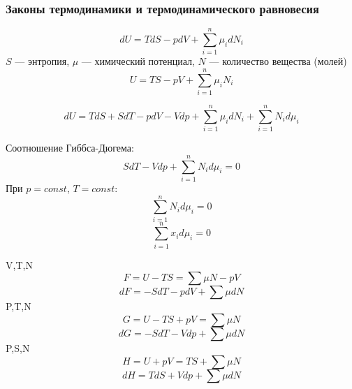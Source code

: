 \begin{frame}
\frametitle{Законы термодинамики и термодинамического равновесия}

\begin{equation}
d U = TdS - pdV + \sum_{i=1}^{n} \mu_i d N_i
\end{equation}
$S$ --- энтропия, $\mu$ --- химический потенциал, $N$ --- количество вещества (молей)
\begin{equation}
U = TS - pV + \sum_{i=1}^{n} \mu_i N_i
\end{equation}

\begin{equation}
d U = T dS + S dT - p dV - V dp + \sum_{i=1}^{n} \mu_i d N_i + \sum_{i=1}^{n}  N_i d \mu_i
\end{equation}



\end{frame}

\begin{frame}
Соотношение Гиббса-Дюгема:
\begin{equation}
S dT -V dp + \sum_{i=1}^{n} N_i d \mu_i =0
\end{equation}
При $p=const$, $T=const$:
\begin{equation}
\sum_{i=1}^{n} N_i d \mu_i =0
\end{equation}
\begin{equation}
\sum_{i=1}^{n} x_i d \mu_i =0
\end{equation}


\end{frame}


\begin{frame}

V,T,N
\begin{equation}
F=U-TS=\sum \mu N -pV
\end{equation}
\begin{equation*}
d F=-S dT -p dV + \sum \mu dN 
\end{equation*}
P,T,N
\begin{equation}
G=U-TS+pV=\sum \mu N 
\end{equation}
\begin{equation*}
d G=-S dT -V dp + \sum \mu dN 
\end{equation*}
P,S,N
\begin{equation}
H=U+pV=TS +\sum \mu N 
\end{equation}
\begin{equation*}
d H=T dS +V dp + \sum \mu dN 
\end{equation*}

\end{frame}

